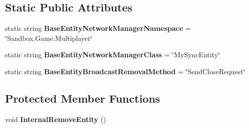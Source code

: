 \subsection*{Static Public Attributes}
\begin{DoxyCompactItemize}
\item 
\hypertarget{class_s_e_mod_a_p_i_internal_1_1_a_p_i_1_1_entity_1_1_base_entity_network_manager_a45b0371af9f1eb9c7ea99efb0a6c18d2}{}static string {\bfseries Base\+Entity\+Network\+Manager\+Namespace} = \char`\"{}Sandbox.\+Game.\+Multiplayer\char`\"{}\label{class_s_e_mod_a_p_i_internal_1_1_a_p_i_1_1_entity_1_1_base_entity_network_manager_a45b0371af9f1eb9c7ea99efb0a6c18d2}

\item 
\hypertarget{class_s_e_mod_a_p_i_internal_1_1_a_p_i_1_1_entity_1_1_base_entity_network_manager_a2c4ee36bfcab3c2197327b500bd1dffd}{}static string {\bfseries Base\+Entity\+Network\+Manager\+Class} = \char`\"{}My\+Sync\+Entity\char`\"{}\label{class_s_e_mod_a_p_i_internal_1_1_a_p_i_1_1_entity_1_1_base_entity_network_manager_a2c4ee36bfcab3c2197327b500bd1dffd}

\item 
\hypertarget{class_s_e_mod_a_p_i_internal_1_1_a_p_i_1_1_entity_1_1_base_entity_network_manager_ac3512d8198e773d6711bf8976c5c9950}{}static string {\bfseries Base\+Entity\+Broadcast\+Removal\+Method} = \char`\"{}Send\+Close\+Request\char`\"{}\label{class_s_e_mod_a_p_i_internal_1_1_a_p_i_1_1_entity_1_1_base_entity_network_manager_ac3512d8198e773d6711bf8976c5c9950}

\end{DoxyCompactItemize}
\subsection*{Protected Member Functions}
\begin{DoxyCompactItemize}
\item 
\hypertarget{class_s_e_mod_a_p_i_internal_1_1_a_p_i_1_1_entity_1_1_base_entity_network_manager_a3d8d15a6d0558e2a6a23634a180c51db}{}void {\bfseries Internal\+Remove\+Entity} ()\label{class_s_e_mod_a_p_i_internal_1_1_a_p_i_1_1_entity_1_1_base_entity_network_manager_a3d8d15a6d0558e2a6a23634a180c51db}

\end{DoxyCompactItemize}
